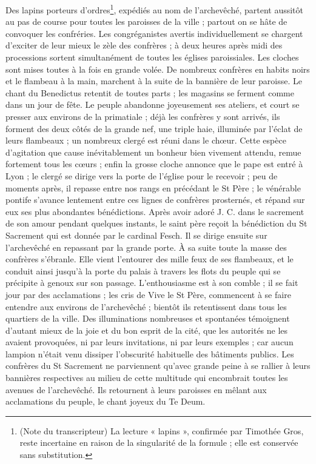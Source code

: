 Des lapins porteurs d'ordres\footnote{(Note du transcripteur) La lecture « lapins », confirmée par Timothée Gros, reste incertaine en raison de la singularité de la formule ; elle est conservée sans substitution.}, expédiés au nom de l'archevêché, partent aussitôt au pas de course pour toutes les paroisses de la ville ; partout on se hâte de convoquer les confréries. Les congréganistes avertis individuellement se chargent d'exciter de leur mieux le zèle des confrères ; à deux heures après midi des processions sortent simultanément de toutes les églises paroissiales. Les cloches sont mises toutes à la fois en grande volée. De nombreux
confrères en habits noirs et le flambeau à la main, marchent à la suite de la bannière de leur paroisse. Le chant du Benedictus retentit de toutes parts ; les magasins se ferment comme dans un jour de fête. Le peuple abandonne joyeusement ses ateliers, et court se presser aux environs de la primatiale ; déjà les confrères y sont arrivés, ils forment des deux côtés de la grande nef, une triple haie, illuminée par l'éclat de leurs flambeaux ; un nombreux clergé est réuni dans le chœur. Cette espèce d'agitation que cause inévitablement un bonheur bien vivement attendu, remue fortement tous les cœurs ; enfin la grosse cloche annonce que le pape est entré à Lyon ; le clergé se dirige vers la porte de l'église pour le recevoir ; peu de moments après, il repasse entre nos rangs en précédant le St Père ; le vénérable pontife s'avance lentement entre ces lignes de confrères prosternés, et répand sur eux ses plus abondantes bénédictions. Après avoir adoré J. C. dans le sacrement de son amour pendant quelques instants, le saint père reçoit la bénédiction du St Sacrement qui est donnée par le cardinal Fesch. Il se dirige ensuite sur l'archevêché en repassant par la grande porte. À sa suite toute la masse des confrères s'ébranle. Elle vient l'entourer des mille feux de ses flambeaux, et le conduit ainsi jusqu'à la porte du palais à travers les flots du peuple qui se précipite à genoux sur son passage. L'enthousiasme est à son comble ; il se fait jour par des acclamations ; les cris de Vive le St Père, commencent à se faire entendre aux environs de l'archevêché ; bientôt ils retentissent dans tous les quartiers de la ville. Des illuminations nombreuses et spontanées témoignent d'autant mieux de la joie et du bon
esprit de la cité, que les autorités ne les avaient provoquées, ni par leurs invitations, ni par leurs exemples ; car aucun lampion n'était venu dissiper l'obscurité habituelle des bâtiments publics. Les confrères du St Sacrement ne parviennent qu'avec grande peine à se rallier à leurs bannières respectives au milieu de cette multitude qui encombrait toutes les avenues de l'archevêché. Ils retournent à leurs paroisses en mêlant aux acclamations du peuple, le chant joyeux du Te Deum.

